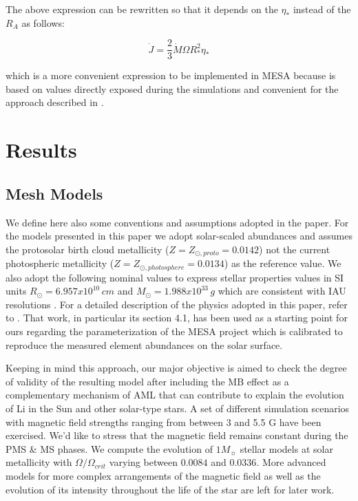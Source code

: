 \documentclass[fleqn,usenatbib]{mnras}
\begin{document}
The above expression can be rewritten so that it depends on the $\eta_*$ instead of the $R_A$ as follows:
\begin{ceqn}
\begin{equation}
 \Dot{J} = \frac{2}{3} \Dot{M}\Omega R^{2}_{*}\eta_* \label{eq:j_dot_mesa}
\end{equation}
\end{ceqn}
which is a more convenient expression to be implemented in MESA because is based on values directly exposed during the simulations and convenient for the approach described in \citet{Ud-Doula2007}.

\section{Results} \label{sec_3}

\subsection{Mesh Models}
We define here also some conventions and assumptions adopted in the paper. For the models presented in this paper we adopt solar-scaled abundances and assumes the \citet{Asplund2009} protosolar birth cloud metallicity ($Z = Z_{\odot, proto} = 0.0142$) not the current photospheric metallicity ($Z = Z_{\odot, photosphere} = 0.0134$) as the reference value. We also adopt the following nominal values to express stellar properties values in SI units $R_{\odot} = 6.957x10^{10}\, cm$ and $M_{\odot} = 1.988x10^{33}\, g$ which are consistent with IAU resolutions \citep{Mamajek2015}. For a detailed description of the physics adopted in this paper, refer to \citet{Choi2016}. That work, in particular its section 4.1, has been used as a starting point for ours regarding the parameterization of the MESA project which is calibrated to reproduce the measured element abundances on the solar surface.\par

Keeping in mind this approach, our major objective is aimed to check the degree of validity of the resulting model after including the MB effect as a complementary mechanism of AML that can contribute to explain the evolution of Li in the Sun and other solar-type stars. A set of different simulation scenarios with magnetic field strengths ranging from between 3 and 5.5 G have been exercised. We'd like to stress that the magnetic field remains constant during the PMS \& MS phases. We compute the evolution of $1M_{\sun}$ stellar models at solar metallicity with $\Omega / \Omega_{crit}$ varying between $0.0084$ and $0.0336$. More advanced models for more complex arrangements of the magnetic field as well as the evolution of its intensity throughout the life of the star are left for later work.\par
\end{document}
